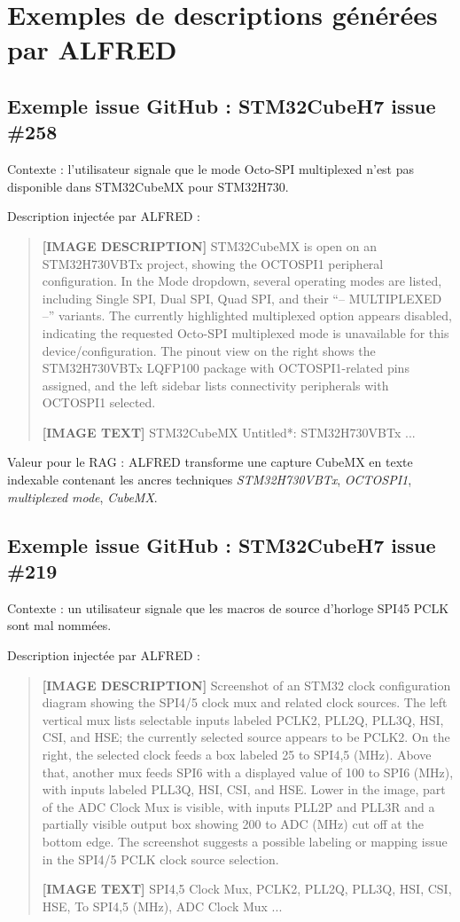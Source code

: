 \documentclass[11pt,a4paper]{article}
\begin{document}
\section{Exemples de descriptions générées par ALFRED}

\subsection{Exemple issue GitHub : STM32CubeH7 issue \#258}

Contexte : l'utilisateur signale que le mode Octo-SPI multiplexed n'est pas disponible dans STM32CubeMX pour STM32H730.

Description injectée par ALFRED :

\begin{quote}\small
\textbf{[IMAGE DESCRIPTION]} STM32CubeMX is open on an STM32H730VBTx project, showing the OCTOSPI1 peripheral configuration. In the Mode dropdown, several operating modes are listed, including Single SPI, Dual SPI, Quad SPI, and their ``-- MULTIPLEXED --'' variants. The currently highlighted multiplexed option appears disabled, indicating the requested Octo-SPI multiplexed mode is unavailable for this device/configuration. The pinout view on the right shows the STM32H730VBTx LQFP100 package with OCTOSPI1-related pins assigned, and the left sidebar lists connectivity peripherals with OCTOSPI1 selected.

\textbf{[IMAGE TEXT]} STM32CubeMX Untitled*: STM32H730VBTx ...
\end{quote}

Valeur pour le RAG : ALFRED transforme une capture CubeMX en texte indexable contenant les ancres techniques \textit{STM32H730VBTx}, \textit{OCTOSPI1}, \textit{multiplexed mode}, \textit{CubeMX}.

\subsection{Exemple issue GitHub : STM32CubeH7 issue \#219}

Contexte : un utilisateur signale que les macros de source d'horloge SPI45 PCLK sont mal nommées.

Description injectée par ALFRED :

\begin{quote}\small
\textbf{[IMAGE DESCRIPTION]} Screenshot of an STM32 clock configuration diagram showing the SPI4/5 clock mux and related clock sources. The left vertical mux lists selectable inputs labeled PCLK2, PLL2Q, PLL3Q, HSI, CSI, and HSE; the currently selected source appears to be PCLK2. On the right, the selected clock feeds a box labeled 25 to SPI4,5 (MHz). Above that, another mux feeds SPI6 with a displayed value of 100 to SPI6 (MHz), with inputs labeled PLL3Q, HSI, CSI, and HSE. Lower in the image, part of the ADC Clock Mux is visible, with inputs PLL2P and PLL3R and a partially visible output box showing 200 to ADC (MHz) cut off at the bottom edge. The screenshot suggests a possible labeling or mapping issue in the SPI4/5 PCLK clock source selection.

\textbf{[IMAGE TEXT]} SPI4,5 Clock Mux, PCLK2, PLL2Q, PLL3Q, HSI, CSI, HSE, To SPI4,5 (MHz), ADC Clock Mux ...
\end{quote}
\end{document}
